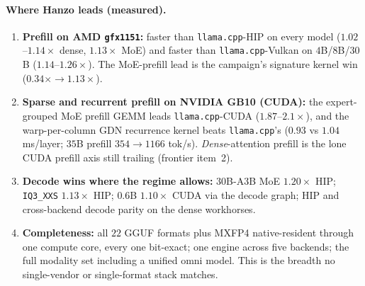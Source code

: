 \documentclass[11pt]{article}
\begin{document}
\paragraph{Where Hanzo leads (measured).}
\begin{enumerate}
  \item \textbf{Prefill on AMD \texttt{gfx1151}:} faster than \texttt{llama.cpp}-HIP on every model
  ($1.02$--$1.14\times$ dense, $1.13\times$ MoE) and faster than \texttt{llama.cpp}-Vulkan on
  $4$B/$8$B/$30$B ($1.14$--$1.26\times$). The MoE-prefill lead is the campaign's signature kernel win
  ($0.34\times \to 1.13\times$).
  \item \textbf{Sparse and recurrent prefill on NVIDIA GB10 (CUDA):} the expert-grouped MoE prefill
  GEMM leads \texttt{llama.cpp}-CUDA ($1.87$--$2.1\times$), and the warp-per-column GDN recurrence kernel
  beats \texttt{llama.cpp}'s ($0.93$ vs $1.04$ ms/layer; $35$B prefill $354 \to 1166$ tok/s).
  \emph{Dense}-attention prefill is the lone CUDA prefill axis still trailing (frontier item~2).
  \item \textbf{Decode wins where the regime allows:} $30$B-A3B MoE $1.20\times$ HIP; \texttt{IQ3\_XXS}
  $1.13\times$ HIP; $0.6$B $1.10\times$ CUDA via the decode graph; HIP and cross-backend decode parity
  on the dense workhorses.
  \item \textbf{Completeness:} all $22$ GGUF formats plus MXFP4 native-resident through one compute
  core, every one bit-exact; one engine across five backends; the full modality set including a unified
  omni model. This is the breadth no single-vendor or single-format stack matches.
\end{enumerate}
\end{document}
